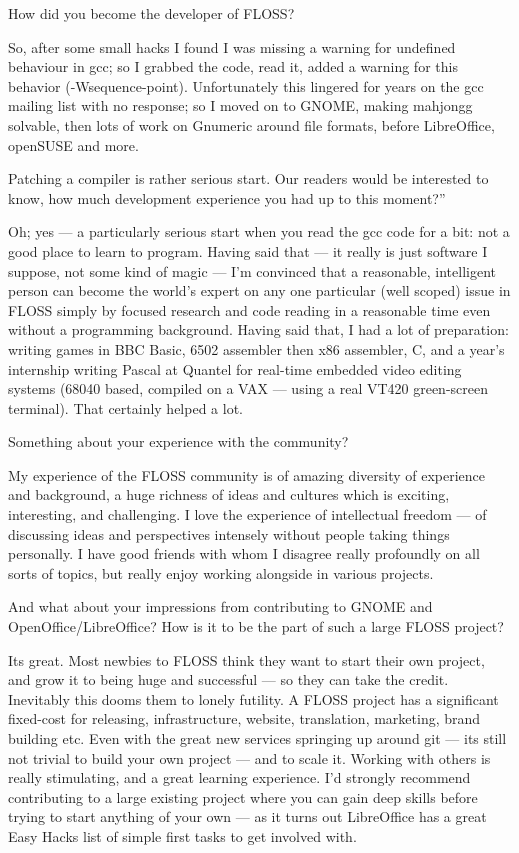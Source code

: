 \documentclass[10pt, a5paper]{article}
\begin{document}
\begin{Parallel}[p]{}{}
{\q How did you become the developer of FLOSS?

\a So, after some small hacks I found I was missing a warning for undefined behaviour in gcc; so I grabbed the code, read it, added a warning for this behavior (-Wsequence-point). Unfortunately this lingered for years on the gcc mailing list with no response; so I moved on to GNOME, making mahjongg solvable, then lots of work on Gnumeric around file formats, before LibreOffice, openSUSE and more.

\q Patching a compiler is rather serious start. Our readers would be interested to know, how much development experience you had up to this moment?'' 

\a Oh; yes — a particularly serious start when you read the gcc code for a bit: not a good place to learn to program. Having said that — it really is just software I suppose, not some kind of magic — I'm convinced that a reasonable, intelligent person can become the world's expert on any one particular (well scoped) issue in FLOSS simply by focused research and code reading in a reasonable time even without a programming background. Having said that, I had a lot of preparation: writing games in BBC Basic, 6502 assembler then x86 assembler, C, and a year's internship writing Pascal at Quantel for real-time embedded video editing systems (68040 based, compiled on a VAX — using a real VT420 green-screen terminal). That certainly helped a lot.

\q Something about your experience with the community?

\a My experience of the FLOSS community is of amazing diversity of experience and background, a huge richness of ideas and cultures which is exciting, interesting, and challenging. I love the experience of intellectual freedom — of discussing ideas and perspectives intensely without people taking things personally. I have good friends with whom I disagree really profoundly on all sorts of topics, but really enjoy working alongside in various projects.

\q And what about your impressions from contributing to GNOME and OpenOffice/LibreOffice? How is it to be the part of such a large FLOSS project?

\a Its great. Most newbies to FLOSS think they want to start their own project, and grow it to being huge and successful — so they can take the credit. Inevitably this dooms them to lonely futility. A FLOSS project has a significant fixed-cost for releasing, infrastructure, website, translation, marketing, brand building etc. Even with the great new services springing up around git — its still not trivial to build your own project — and to scale it. Working with others is really stimulating, and a great learning experience. I'd strongly recommend contributing to a large existing project where you can gain deep skills before trying to start anything of your own — as it turns out LibreOffice has a great Easy Hacks list of simple first tasks to get involved with.

}
\end{Parallel}
\end{document}
